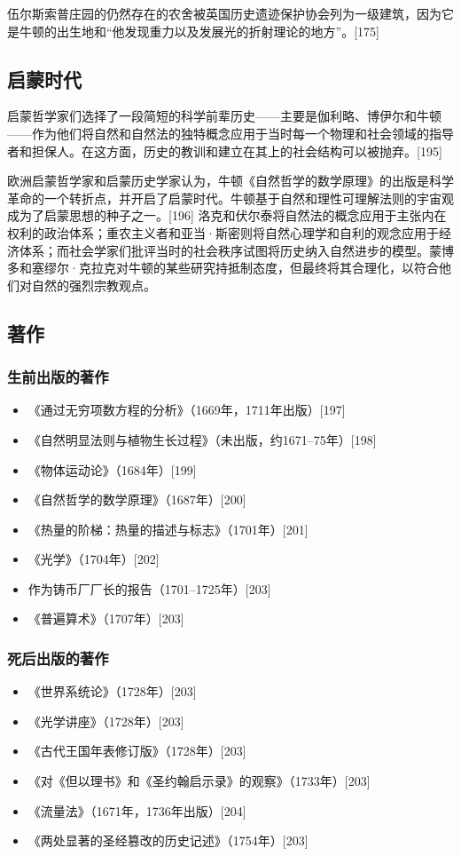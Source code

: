 伍尔斯索普庄园的仍然存在的农舍被英国历史遗迹保护协会列为一级建筑，因为它是牛顿的出生地和“他发现重力以及发展光的折射理论的地方”。[175]
\subsection{启蒙时代}  
启蒙哲学家们选择了一段简短的科学前辈历史——主要是伽利略、博伊尔和牛顿——作为他们将自然和自然法的独特概念应用于当时每一个物理和社会领域的指导者和担保人。在这方面，历史的教训和建立在其上的社会结构可以被抛弃。[195]

欧洲启蒙哲学家和启蒙历史学家认为，牛顿《自然哲学的数学原理》的出版是科学革命的一个转折点，并开启了启蒙时代。牛顿基于自然和理性可理解法则的宇宙观成为了启蒙思想的种子之一。[196] 洛克和伏尔泰将自然法的概念应用于主张内在权利的政治体系；重农主义者和亚当·斯密则将自然心理学和自利的观念应用于经济体系；而社会学家们批评当时的社会秩序试图将历史纳入自然进步的模型。蒙博多和塞缪尔·克拉克对牛顿的某些研究持抵制态度，但最终将其合理化，以符合他们对自然的强烈宗教观点。
\subsection{著作}  
\subsubsection{生前出版的著作}  
\begin{itemize}
\item 《通过无穷项数方程的分析》（1669年，1711年出版）[197]  
\item 《自然明显法则与植物生长过程》（未出版，约1671–75年）[198]  
\item 《物体运动论》（1684年）[199]  
\item 《自然哲学的数学原理》（1687年）[200]  
\item 《热量的阶梯：热量的描述与标志》（1701年）[201]  
\item 《光学》（1704年）[202]  
\item 作为铸币厂厂长的报告（1701–1725年）[203]  
\item 《普遍算术》（1707年）[203]
\end{itemize}
\subsubsection{死后出版的著作}  
\begin{itemize}
\item 《世界系统论》（1728年）[203]  
\item 《光学讲座》（1728年）[203]  
\item 《古代王国年表修订版》（1728年）[203]  
\item 《对《但以理书》和《圣约翰启示录》的观察》（1733年）[203]  
\item 《流量法》（1671年，1736年出版）[204]  
\item 《两处显著的圣经篡改的历史记述》（1754年）[203]
\end{itemize}
